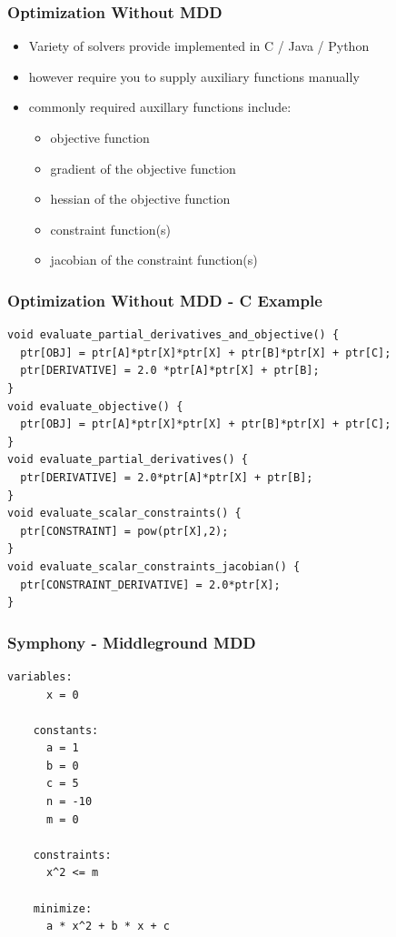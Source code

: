 \documentclass[presentation]{beamer}
\begin{document}
\begin{frame}
  \frametitle{Optimization Without MDD}

  \begin{itemize}
  \item Variety of solvers provide implemented in C / Java / Python
  \item however require you to supply auxiliary functions manually
  \item commonly required auxillary functions include:
    \begin{itemize}
    \item objective function
    \item gradient of the objective function
    \item hessian of the objective function
    \item constraint function(s)
    \item jacobian of the constraint function(s)
    \end{itemize}
  \end{itemize}
\end{frame}

\begin{frame}[fragile]
  \frametitle{Optimization Without MDD - C Example}

\begin{lstlisting}[style=CStyle]
void evaluate_partial_derivatives_and_objective() {
  ptr[OBJ] = ptr[A]*ptr[X]*ptr[X] + ptr[B]*ptr[X] + ptr[C];
  ptr[DERIVATIVE] = 2.0 *ptr[A]*ptr[X] + ptr[B];
}
void evaluate_objective() {
  ptr[OBJ] = ptr[A]*ptr[X]*ptr[X] + ptr[B]*ptr[X] + ptr[C];
}
void evaluate_partial_derivatives() {
  ptr[DERIVATIVE] = 2.0*ptr[A]*ptr[X] + ptr[B];
}
void evaluate_scalar_constraints() {
  ptr[CONSTRAINT] = pow(ptr[X],2);
}
void evaluate_scalar_constraints_jacobian() {
  ptr[CONSTRAINT_DERIVATIVE] = 2.0*ptr[X];
}
\end{lstlisting}
\end{frame}

\begin{frame}[fragile]
  \frametitle{Symphony - Middleground MDD}
  \begin{lstlisting}[style=CStyle]
    variables:
      x = 0

    constants:
      a = 1
      b = 0
      c = 5
      n = -10
      m = 0

    constraints:
      x^2 <= m

    minimize:
      a * x^2 + b * x + c   
  \end{lstlisting}
\end{frame}
\end{document}
